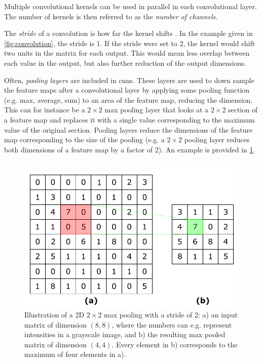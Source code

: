 Multiple convolutional kernels can be used in parallel in each convolutional layer. The number of kernels is then referred to as the \textit{number of channels}. 

The \textit{stride} of a convolution is how far the kernel shifts \cite{oshea2015introduction}. In the example given in \cref{fig:convolution}, the stride is 1. If the stride were set to 2, the kernel would shift two units in the matrix for each output. This would mean less overlap between each value in the output, but also further reduction of the output dimensions. 

Often, \textit{pooling layers} are included in \gls{cnn}s. These layers are used to down sample the feature maps after a convolutional layer by applying some pooling function (e.g. max, average, sum) to an area of the feature map, reducing the dimension. This can for instance be a $2\times2$ max pooling layer that looks at a $2\times2$ section of a feature map and replaces it with a single value corresponding to the maximum value of the original section. Pooling layers reduce the dimensions of the feature map corresponding to the size of the pooling (e.g. a $2\times2$ pooling layer reduces both dimensions of a feature map by a factor of $2$). An example is provided in \cref{fig:maxpool}. 

\begin{figure}[htbp]  
    \centering
    \includegraphics[width=.7\textwidth]{figures/maxpool.pdf}
    \caption[Illustration of a max pooling operation]{Illustration of a 2D $2\times2$ max pooling with a stride of 2: a) an input matrix of dimension $(8,8)$, where the numbers can e.g. represent intensities in a grayscale image, and b) the resulting max pooled matrix of dimension $(4,4)$. Every element in b) corresponds to the maximum of four elements in a). }
    \label{fig:maxpool}
\end{figure}

